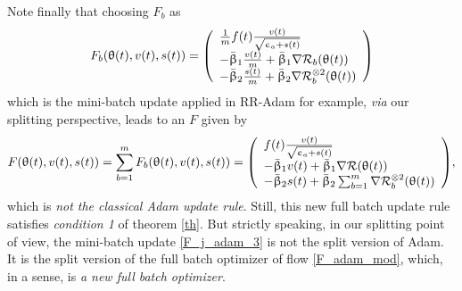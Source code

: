 \documentclass[article,authoryear,jmlmc]{beg_32}             %
\begin{document}
Note finally that choosing $F_b$ as
\begin{eqnarray}
\label{F_j_adam_3}
F_b(\theta(t),v(t),s(t))=\left(\begin{array}{l}
  \frac{1}{m}f(t) \frac{v(t)}{\sqrt{\epsilon_a+s(t)}}\\
     -\bar{\beta}_1 \frac{v(t)}{m}+\bar{\beta}_1\nR_b(\theta(t))\\
     -\bar{\beta}_2 \frac{s(t)}{m}+\bar{\beta}_2\nR_b^{\otimes 2}(\theta(t))\\
  \end{array}\right)
\end{eqnarray}
which is the mini-batch update applied in RR-Adam for example, {\em via} our splitting perspective, 
leads to an $F$ given by 
\begin{eqnarray}
\label{F_adam_mod}
  F(\theta(t),v(t),s(t))=\sum_{b=1}^m F_b(\theta(t),v(t),s(t))=\left(\begin{array}{l}
  f(t) \frac{v(t)}{\sqrt{\epsilon_a+s(t)}}\\
     -\bar{\beta}_1 {v(t)}+\bar{\beta}_1\nR(\theta(t))\\
     -\bar{\beta}_2 {s(t)}+\bar{\beta}_2\sum_{b=1}^m \nR_b^{\otimes 2}(\theta(t))\\
  \end{array}\right),
\end{eqnarray}
which is {\em not the classical Adam update rule}. Still, this new full batch update rule satisfies
{\em condition 1} of theorem \ref{th}. But strictly speaking, in our splitting point of view, the mini-batch update \eqref{F_j_adam_3} is not the split version of Adam. 
It is the split version of the full batch optimizer of flow \eqref{F_adam_mod}, which, in a sense, is {\em a new full batch optimizer}.  
\end{document}
